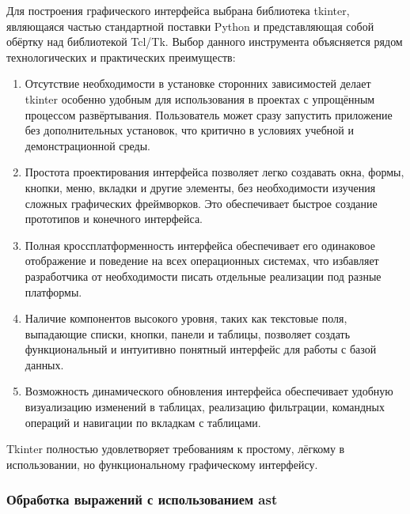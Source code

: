 Для построения графического интерфейса выбрана библиотека tkinter, являющаяся частью стандартной поставки Python и представляющая собой обёртку над библиотекой Tcl/Tk. Выбор данного инструмента объясняется рядом технологических и практических преимуществ:
\begin{enumerate}
	\item Отсутствие необходимости в установке сторонних зависимостей делает tkinter особенно удобным для использования в проектах с упрощённым процессом развёртывания. Пользователь может сразу запустить приложение без дополнительных установок, что критично в условиях учебной и демонстрационной среды.
	\item Простота проектирования интерфейса позволяет легко создавать окна, формы, кнопки, меню, вкладки и другие элементы, без необходимости изучения сложных графических фреймворков. Это обеспечивает быстрое создание прототипов и конечного интерфейса.
	\item Полная кроссплатформенность интерфейса обеспечивает его одинаковое отображение и поведение на всех операционных системах, что избавляет разработчика от необходимости писать отдельные реализации под разные платформы.
	\item Наличие компонентов высокого уровня, таких как текстовые поля, выпадающие списки, кнопки, панели и таблицы, позволяет создать функциональный и интуитивно понятный интерфейс для работы с базой данных.
	\item Возможность динамического обновления интерфейса обеспечивает удобную визуализацию изменений в таблицах, реализацию фильтрации, командных операций и навигации по вкладкам с таблицами.
\end{enumerate}

Tkinter полностью удовлетворяет требованиям к простому, лёгкому в использовании, но функциональному графическому интерфейсу.

\subsubsection{Обработка выражений с использованием ast}

